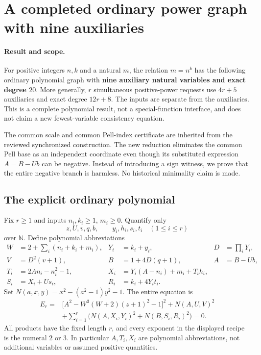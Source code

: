 \section{A completed ordinary power graph with nine auxiliaries}
\label{sec:signed-power-frame}

\paragraph{Result and scope.}
For positive integers $n,k$ and a natural $m$, the relation $m=n^k$
has the following ordinary polynomial graph with \textbf{nine auxiliary
natural variables and exact degree $20$}. More generally, $r$ simultaneous
positive-power requests use $4r+5$ auxiliaries and exact degree $12r+8$.
The inputs are separate from the auxiliaries. This is a complete polynomial
result, not a special-function interface, and does not claim a new
fewest-variable consistency equation.

The common scale and common Pell-index certificate are inherited from the
reviewed synchronized construction. The new reduction eliminates the common
Pell base as an independent coordinate even though its substituted expression
$A=B-Ub$ can be negative. Instead of introducing a sign witness, we prove
that the entire negative branch is harmless. No historical minimality claim is made.

\subsection{The explicit ordinary polynomial}
Fix $r\geq1$ and inputs $n_i,k_i\geq1$, $m_i\geq0$. Quantify only
\[
 z,U,v,q,b,\qquad y_i,h_i,s_i,t_i\quad(1\leq i\leq r)
\]
over $\mathbb N$. Define polynomial abbreviations
\begin{align*}
 W&=2+\sum_i(n_i+k_i+m_i),&Y_i&=k_i+y_i,&D&=\prod_iY_i,\\
 V&=D^2(v+1),&B&=1+4D(q+1),&A&=B-Ub,\\
 T_i&=2An_i-n_i^2-1,&X_i&=Y_i(A-n_i)+m_i+T_i h_i,\\
 S_i&=X_i+Us_i,&R_i&=k_i+4Y_it_i.
\end{align*}
Set $N(a,x,y)=x^2-(a^2-1)y^2-1$. The entire equation is
\begin{equation}
\boxed{\begin{aligned}
E_r={}&\bigl[A^2-W^3(W+2)(z+1)^2-1\bigr]^2+N(A,U,V)^2\\
&+\sum_{i=1}^r\bigl(N(A,X_i,Y_i)^2+N(B,S_i,R_i)^2\bigr)=0.
\end{aligned}}
\label{eq:signed-power}
\end{equation}
All products have the fixed length $r$, and every exponent in the displayed
recipe is the numeral $2$ or $3$. In particular $A,T_i,X_i$ are polynomial
abbreviations, not additional variables or assumed positive quantities.

